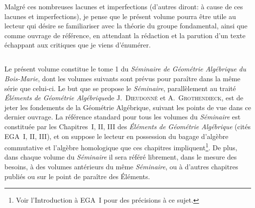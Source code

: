 Malgr\'e ces nombreuses lacunes et imperfections (d'autres diront:
\`a cause de ces lacunes et imperfections), je pense que le
pr\'esent volume pourra \^etre utile au lecteur qui d\'esire se
familiariser avec la th\'eorie du groupe fondamental, ainsi que
comme ouvrage de r\'ef\'erence, en attendant la r\'edaction et
la parution d'un texte \'echappant aux critiques que je viens
d'\'enum\'erer.

\subsection{}
\label{I.introduction.2}
Le pr\'esent volume constitue le tome 1 du
\og \emph{Séminaire de Géométrie Algébrique du
Bois-Marie}\fg, dont les volumes suivants sont pr\'evus pour
para\^itre dans la m\^eme s\'erie que celui-ci. Le but que se
propose le \emph{Séminaire}, parall\`element au trait\'e
\og \emph{Éléments de Géométrie Algébrique}\fg de J.\, \textsc{Dieudonné} et
A.\, \textsc{Grothendieck}, est de jeter les fondements de la G\'eom\'etrie
Alg\'ebrique, suivant les points de vue dans ce dernier ouvrage. La
r\'ef\'erence standard pour tous les volumes du
\emph{Séminaire} est constitu\'ee par les Chapitres~I, II, III
des \og \emph{Éléments de Géométrie Algébrique}\fg
(cit\'es EGA~I, II, III), et on suppose le lecteur en possession du
bagage d'alg\`ebre commutative et l'alg\`ebre homologique que ces
chapitres impliquent\footnote{Voir l'Introduction \`a EGA~I pour des
pr\'ecisions \`a ce sujet.}. De plus, dans chaque volume du
\emph{Séminaire} il sera r\'ef\'er\'e librement, dans le
mesure des besoins, \`a des volumes ant\'erieurs du m\^eme
\emph{Séminaire}, ou \`a d'autres chapitres publi\'es ou sur
le point de para\^itre des \og \'El\'ements\fg.

